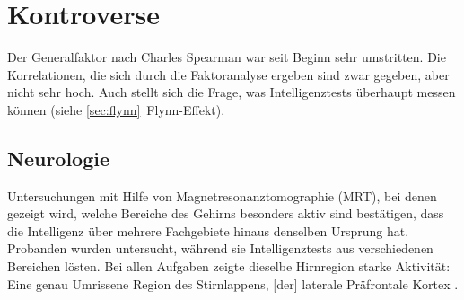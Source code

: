 \cite{wiki_intheorie}

\section{Kontroverse}
Der Generalfaktor nach Charles Spearman war seit Beginn sehr umstritten. Die Korrelationen, die sich durch die Faktoranalyse ergeben sind zwar gegeben, aber nicht sehr hoch. Auch stellt sich die Frage, was Intelligenztests überhaupt messen können (siehe \ref{sec:flynn}~Flynn-Effekt).


\subsection{Neurologie}
Untersuchungen mit Hilfe von Magnetresonanztomographie (MRT), bei denen gezeigt wird, welche Bereiche des Gehirns besonders aktiv sind bestätigen, dass die Intelligenz über mehrere Fachgebiete hinaus denselben Ursprung hat.
Probanden wurden untersucht, während sie Intelligenztests aus verschiedenen Bereichen lösten. Bei allen Aufgaben zeigte dieselbe Hirnregion starke Aktivität: Eine \glqq genau Umrissene Region des Stirnlappens, [der] laterale Präfrontale Kortex \grqq{} \cite{geok15}.

